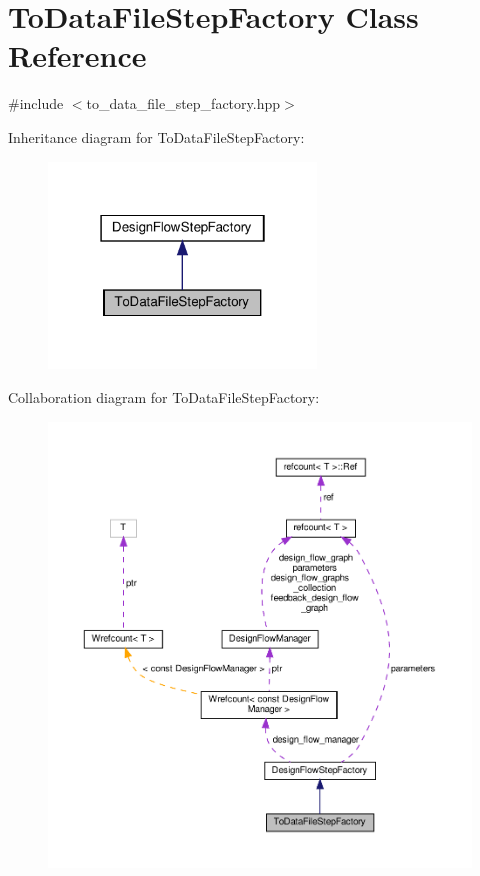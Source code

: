 \hypertarget{classToDataFileStepFactory}{}\section{To\+Data\+File\+Step\+Factory Class Reference}
\label{classToDataFileStepFactory}


{\ttfamily \#include $<$to\+\_\+data\+\_\+file\+\_\+step\+\_\+factory.\+hpp$>$}



Inheritance diagram for To\+Data\+File\+Step\+Factory\+:
\nopagebreak
\begin{figure}[H]
\begin{center}
\leavevmode
\includegraphics[width=202pt]{d5/d82/classToDataFileStepFactory__inherit__graph}
\end{center}
\end{figure}


Collaboration diagram for To\+Data\+File\+Step\+Factory\+:
\nopagebreak
\begin{figure}[H]
\begin{center}
\leavevmode
\includegraphics[width=350pt]{d3/def/classToDataFileStepFactory__coll__graph}
\end{center}
\end{figure}
